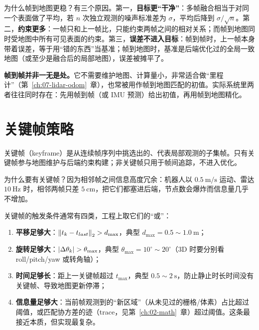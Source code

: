 为什么帧到地图更稳？有三个原因。第一，\textbf{目标更``干净''}：多帧融合相当于对同一个表面做了平均，若 $n$ 次独立观测的噪声标准差为 $\sigma$，平均后降到 $\sigma/\sqrt{n}$。第二，\textbf{约束更多}：一帧只和上一帧比，只能约束两帧之间的相对关系；而帧到地图同时受地图中所有可见表面的约束。第三，\textbf{误差不进入目标}：帧到帧时，上一帧本身带着误差，等于用``错的东西''当基准；帧到地图时，基准是后端优化过的全局一致地图（或至少是融合后的局部地图），误差被摊平了。

\begin{note}
\textbf{帧到帧并非一无是处。}它不需要维护地图、计算量小，非常适合做``里程计''（第~\ref{ch:07-lidar-odom}~章），也常被用作帧到地图匹配的初值。实际系统里两者往往同时存在：先用帧到帧（或 IMU 预测）给出初值，再用帧到地图精化。
\end{note}

\section{关键帧策略}\label{sec:12-keyframe}

\begin{definition}[关键帧]
关键帧（keyframe）是从连续帧序列中挑选出的、代表局部观测的子集帧。只有关键帧参与地图维护与后端约束构建；非关键帧只用于帧间追踪，不进入优化。
\end{definition}

为什么要有关键帧？因为相邻帧之间信息高度冗余：机器人以 $0.5\ \mathrm{m/s}$ 运动、雷达 $10\ \mathrm{Hz}$ 时，相邻两帧只差 $5\ \mathrm{cm}$，把它们都塞进后端，节点数会爆炸而信息量几乎不增加。

关键帧的触发条件通常有四类，工程上取它们的``或''：
\begin{enumerate}
  \item \textbf{平移足够大}：$\left\lVert t_k-t_{last} \right\rVert_2 > d_{\max}$，典型 $d_{\max}=0.5\sim1.0\ \mathrm{m}$；
  \item \textbf{旋转足够大}：$\left\lvert \Delta\theta_k \right\rvert > \theta_{\max}$，典型 $\theta_{\max}=10^{\circ}\sim20^{\circ}$（3D 时要分别看 roll/pitch/yaw 或转角轴）；
  \item \textbf{时间足够长}：距上一关键帧超过 $t_{\max}$，典型 $0.5\sim2\ \mathrm{s}$，防止静止时长时间没有关键帧、导致地图更新停滞；
  \item \textbf{信息量足够大}：当前帧观测到的``新区域''（从未见过的栅格/体素）占比超过阈值，或匹配协方差的迹（trace，见第~\ref{ch:02-math}~章）超过阈值。这条最接近本质，但实现最复杂。
\end{enumerate}

